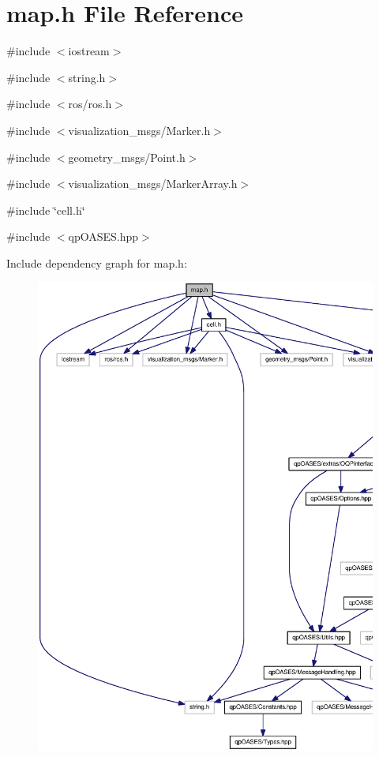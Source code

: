 \section{map.h File Reference}
\label{map_8h}
{\ttfamily \#include $<$iostream$>$}\par
{\ttfamily \#include $<$string.h$>$}\par
{\ttfamily \#include $<$ros/ros.h$>$}\par
{\ttfamily \#include $<$visualization\_\-msgs/Marker.h$>$}\par
{\ttfamily \#include $<$geometry\_\-msgs/Point.h$>$}\par
{\ttfamily \#include $<$visualization\_\-msgs/MarkerArray.h$>$}\par
{\ttfamily \#include \char`\"{}cell.h\char`\"{}}\par
{\ttfamily \#include $<$qpOASES.hpp$>$}\par
Include dependency graph for map.h:
\nopagebreak
\begin{figure}[H]
\begin{center}
\leavevmode
\includegraphics[width=400pt]{map_8h__incl}
\end{center}
\end{figure}
